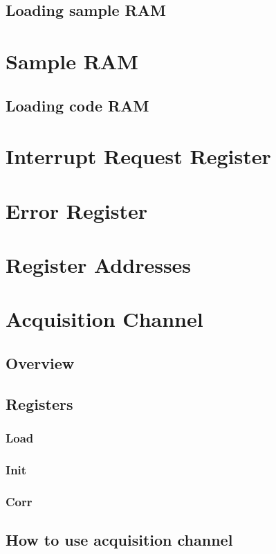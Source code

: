 \documentclass{article}
\begin{document}
\begin{multicols}{2}
\subsection{Loading sample RAM}

\section{Sample RAM}
\subsection{Loading code RAM}

\section{Interrupt Request Register}

\section{Error Register}

\section{Register Addresses}

\section{Acquisition Channel}
\subsection{Overview}
\subsection{Registers}
\subsubsection{Load}
\subsubsection{Init}
\subsubsection{Corr}
\subsection{How to use acquisition channel}

\end{multicols}
\end{document}
